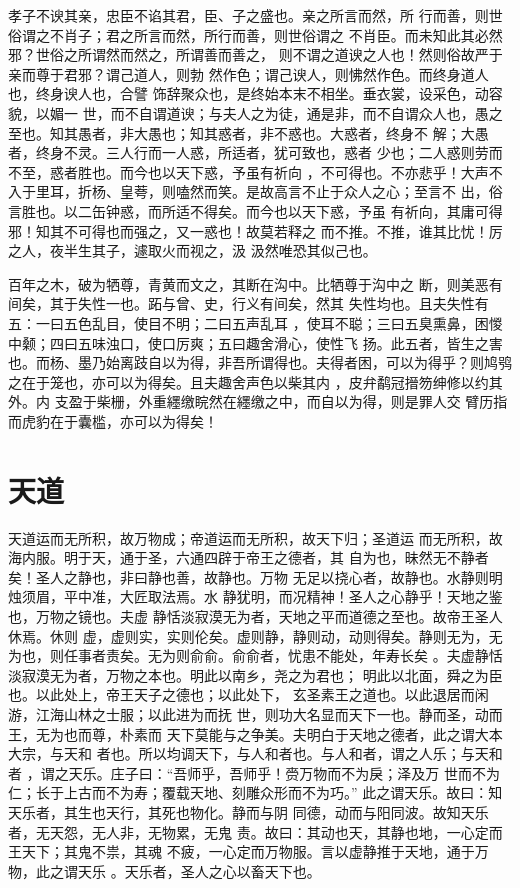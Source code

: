 \documentclass[12pt,UTF8]{ctexbook}
\begin{document}
孝子不谀其亲，忠臣不谄其君，臣、子之盛也。亲之所言而然，所 行而善，则世俗谓之不肖子；君之所言而然，所行而善，则世俗谓之 不肖臣。而未知此其必然邪？世俗之所谓然而然之，所谓善而善之， 则不谓之道谀之人也！然则俗故严于亲而尊于君邪？谓己道人，则勃 然作色；谓己谀人，则怫然作色。而终身道人也，终身谀人也，合譬 饰辞聚众也，是终始本末不相坐。垂衣裳，设采色，动容貌，以媚一 世，而不自谓道谀；与夫人之为徒，通是非，而不自谓众人也，愚之 至也。知其愚者，非大愚也；知其惑者，非不惑也。大惑者，终身不 解；大愚者，终身不灵。三人行而一人惑，所适者，犹可致也，惑者 少也；二人惑则劳而不至，惑者胜也。而今也以天下惑，予虽有祈向 ，不可得也。不亦悲乎！大声不入于里耳，折杨、皇荂，则嗑然而笑。是故高言不止于众人之心；至言不 出，俗言胜也。以二缶钟惑，而所适不得矣。而今也以天下惑，予虽 有祈向，其庸可得邪！知其不可得也而强之，又一惑也！故莫若释之 而不推。不推，谁其比忧！厉之人，夜半生其子，遽取火而视之，汲 汲然唯恐其似己也。

百年之木，破为牺尊，青黄而文之，其断在沟中。比牺尊于沟中之 断，则美恶有间矣，其于失性一也。跖与曾、史，行义有间矣，然其 失性均也。且夫失性有五：一曰五色乱目，使目不明；二曰五声乱耳 ，使耳不聪；三曰五臭熏鼻，困惾中颡；四曰五味浊口，使口厉爽；五曰趣舍滑心，使性飞 扬。此五者，皆生之害也。而杨、墨乃始离跂自以为得，非吾所谓得也。夫得者困，可以为得乎？则鸠鸮之在于笼也，亦可以为得矣。且夫趣舍声色以柴其内 ，皮弁鹬冠搢笏绅修以约其外。内 支盈于柴栅，外重纆缴睆然在纆缴之中，而自以为得，则是罪人交 臂历指而虎豹在于囊槛，亦可以为得矣！

\section{天道}

天道运而无所积，故万物成；帝道运而无所积，故天下归；圣道运 而无所积，故海内服。明于天，通于圣，六通四辟于帝王之德者，其 自为也，昧然无不静者矣！圣人之静也，非曰静也善，故静也。万物 无足以挠心者，故静也。水静则明烛须眉，平中准，大匠取法焉。水 静犹明，而况精神！圣人之心静乎！天地之鉴也，万物之镜也。夫虚 静恬淡寂漠无为者，天地之平而道德之至也。故帝王圣人休焉。休则 虚，虚则实，实则伦矣。虚则静，静则动，动则得矣。静则无为，无 为也，则任事者责矣。无为则俞俞。俞俞者，忧患不能处，年寿长矣 。夫虚静恬淡寂漠无为者，万物之本也。明此以南乡，尧之为君也； 明此以北面，舜之为臣也。以此处上，帝王天子之德也；以此处下， 玄圣素王之道也。以此退居而闲游，江海山林之士服；以此进为而抚 世，则功大名显而天下一也。静而圣，动而王，无为也而尊，朴素而 天下莫能与之争美。夫明白于天地之德者，此之谓大本大宗，与天和 者也。所以均调天下，与人和者也。与人和者，谓之人乐；与天和者 ，谓之天乐。庄子曰：“吾师乎，吾师乎！赍万物而不为戾；泽及万 世而不为仁；长于上古而不为寿；覆载天地、刻雕众形而不为巧。” 此之谓天乐。故曰：知天乐者，其生也天行，其死也物化。静而与阴 同德，动而与阳同波。故知天乐者，无天怨，无人非，无物累，无鬼 责。故曰：其动也天，其静也地，一心定而王天下；其鬼不祟，其魂 不疲，一心定而万物服。言以虚静推于天地，通于万物，此之谓天乐 。天乐者，圣人之心以畜天下也。
\end{document}
